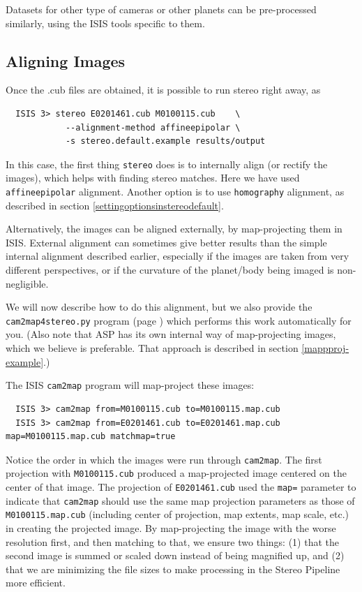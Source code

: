Datasets for other type of cameras or other planets can be pre-processed
similarly, using the ISIS tools specific to them.

\subsection{Aligning Images}
\label{sec:AligningImages}

Once the .cub files are obtained, it is possible to run stereo right away,
as
\begin{verbatim}
  ISIS 3> stereo E0201461.cub M0100115.cub    \
            --alignment-method affineepipolar \
            -s stereo.default.example results/output
\end{verbatim}

In this case, the first thing \texttt{stereo} does is to internally
align (or rectify the images), which helps with finding stereo matches.
Here we have used \texttt{affineepipolar} alignment.  Another option is
to use \texttt{homography} alignment, as described in section
\ref{settingoptionsinstereodefault}.

Alternatively, the images can be aligned externally, by map-projecting
them in \ac{ISIS}. External alignment can sometimes give better results
than the simple internal alignment described earlier, especially if the
images are taken from very different perspectives, or if the curvature
of the planet/body being imaged is non-negligible.


We will now describe how to do this alignment, but we also provide the
\texttt{cam2map4stereo.py} program (page \pageref{cam2map4stereo}) which
performs this work automatically for you. (Also note that ASP has its
own internal way of map-projecting images, which we believe is preferable.
That approach is described in section \ref{mappproj-example}.)

The \ac{ISIS} \texttt{cam2map} program will map-project these images:

\begin{verbatim}
  ISIS 3> cam2map from=M0100115.cub to=M0100115.map.cub
  ISIS 3> cam2map from=E0201461.cub to=E0201461.map.cub map=M0100115.map.cub matchmap=true
\end{verbatim}

Notice the order in which the images were run through
\texttt{cam2map}. The first projection with \texttt{M0100115.cub}
produced a map-projected image centered on the center of that image.
The projection of \texttt{E0201461.cub} used the \texttt{map=}
parameter to indicate that \texttt{cam2map} should use the same map
projection parameters as those of \texttt{M0100115.map.cub} (including
center of projection, map extents, map scale, etc.) in creating the
projected image. By map-projecting the image with the worse resolution
first, and then matching to that, we ensure two things: (1) that the
second image is summed or scaled down instead of being magnified up,
and (2) that we are minimizing the file sizes to make processing in
the Stereo Pipeline more efficient.


